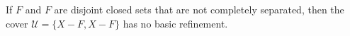 If $F$ and $F$ are disjoint closed sets that are not completely separated, then the cover $\mathcal{U} = \{X - F, X - F\}$ has no basic refinement.
